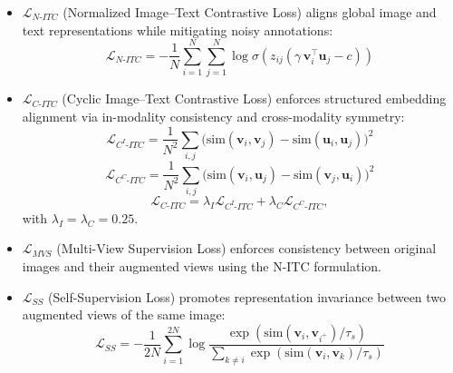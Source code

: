 \documentclass{article}
\begin{document}
\begin{itemize}[nosep,leftmargin=*]
\item $\mathcal{L}_{N\text{-}ITC}$ (Normalized Image--Text Contrastive Loss) aligns global image and text representations while mitigating noisy annotations:
\vspace{-0.5em}
\begin{equation}
\mathcal{L}_{N\text{-}ITC}= -\frac{1}{N}\sum_{i=1}^{N} \sum_{j=1}^{N}\log\sigma \!\left(z_{ij} \left( \gamma \, \mathbf{v}_i^\top \mathbf{u}_j - c \right)\right)
\end{equation}

\vspace{-0.5em}
\item $\mathcal{L}_{C\text{-}ITC}$ (Cyclic Image--Text Contrastive Loss) enforces structured embedding alignment via in-modality consistency and cross-modality symmetry:
\vspace{-0.5em}
\begin{equation}
\mathcal{L}_{C^I\text{-}ITC}\!=\!\frac{1}{N^2}\!\sum_{i,j}\!\big(\text{sim}(\mathbf{v}_i, \mathbf{v}_j)\!-\!\text{sim}(\mathbf{u}_i, \mathbf{u}_j)\big)^2
\end{equation}
\vspace{-1em}
\begin{equation}
\mathcal{L}_{C^C\text{-}ITC}\!=\!\frac{1}{N^2}\!\sum_{i,j}\!\big(\text{sim}(\mathbf{v}_i, \mathbf{u}_j)\!-\!\text{sim}(\mathbf{v}_j, \mathbf{u}_i)\big)^2
\end{equation}
\vspace{-1em}
\begin{equation}
\mathcal{L}_{C\text{-}ITC} = \lambda_I \mathcal{L}_{C^I\text{-}ITC} + \lambda_C \mathcal{L}_{C^C\text{-}ITC},
\end{equation}
with $\lambda_I = \lambda_C = 0.25$.

\vspace{-0.3em}
\item $\mathcal{L}_{MVS}$ (Multi-View Supervision Loss) enforces consistency between original images and their augmented views using the N-ITC formulation.

\vspace{-0.3em}
\item $\mathcal{L}_{SS}$ (Self-Supervision Loss) promotes representation invariance between two augmented views of the same image:
\vspace{-0.5em}
\begin{equation}
\mathcal{L}_{SS}=-\frac{1}{2N}\sum_{i=1}^{2N}\log\frac{\exp \!\left(\text{sim}(\mathbf{v}_i, \mathbf{v}_{i^+})/\tau_s\right)
}{\sum_{k \neq i}\exp \!\left(\text{sim}(\mathbf{v}_i, \mathbf{v}_k)/\tau_s\right)}
\end{equation}
\end{itemize}
\end{document}
